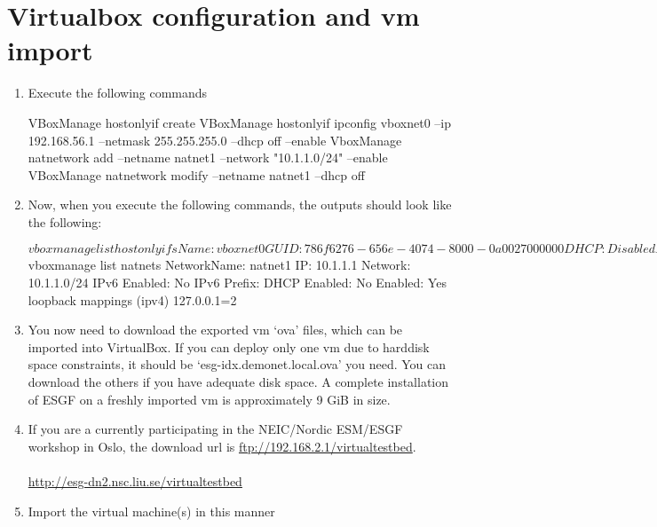 \section{Virtualbox configuration and vm import}
\begin{enumerate}
\item Execute the following commands
\begin{tiny}
\begin{verbatimtab}[4]
VBoxManage hostonlyif create
VBoxManage hostonlyif ipconfig vboxnet0 --ip 192.168.56.1 --netmask 255.255.255.0 --dhcp off --enable
VboxManage natnetwork add --netname natnet1 --network "10.1.1.0/24" --enable
VBoxManage natnetwork modify --netname natnet1 --dhcp off
\end{verbatimtab}
\end{tiny}
\newpage
\item Now, when you execute the following commands, the outputs should look like the following:
\begin{verbatimtab}$ vboxmanage list hostonlyifs
Name:            vboxnet0
GUID:            786f6276-656e-4074-8000-0a0027000000
DHCP:            Disabled
IPAddress:       192.168.56.1
NetworkMask:     255.255.255.0
IPV6Address:     fe80:0000:0000:0000:0800:27ff:fe00:0000
IPV6NetworkMaskPrefixLength: 64
HardwareAddress: 0a:00:27:00:00:00
MediumType:      Ethernet
Status:          Up
VBoxNetworkName: HostInterfaceNetworking-vboxnet0

[pchengi@direwolf ~]$ vboxmanage list natnets
NetworkName:    natnet1
IP:             10.1.1.1
Network:        10.1.1.0/24
IPv6 Enabled:   No
IPv6 Prefix:    
DHCP Enabled:   No
Enabled:        Yes
loopback mappings (ipv4)
        127.0.0.1=2
\end{verbatimtab}
\item You now need to download the exported vm `ova' files, which can be imported into VirtualBox. If you can deploy only one vm due to harddisk space constraints, it should be `esg-idx.demonet.local.ova' you need. You can download the others if you have adequate disk space. A complete installation of ESGF on a freshly imported vm is approximately 9 GiB in size.
\item If you are a currently participating in the NEIC/Nordic ESM/ESGF workshop in Oslo, the download url is \url{ftp://192.168.2.1/virtualtestbed}. \\  \\ \url{http://esg-dn2.nsc.liu.se/virtualtestbed}
\newpage
\item Import the virtual machine(s) in this manner
\begin{tiny}
\end{tiny}
\end{enumerate}
